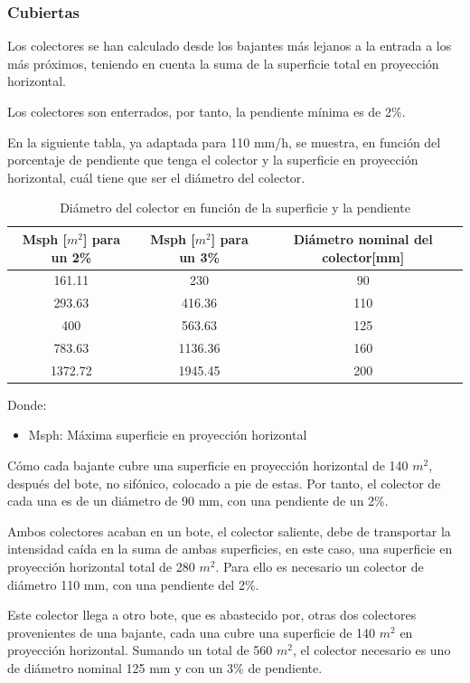 \documentclass[../main.tex]{subfiles}
\begin{document}
\subsubsection{Cubiertas}

Los colectores se han calculado desde los bajantes más lejanos a la entrada a los más próximos, teniendo en cuenta la suma de la superficie total en proyección horizontal.

Los colectores son enterrados, por tanto, la pendiente mínima es de 2\%.

En la siguiente tabla, ya adaptada para 110 mm/h, se muestra, en función del porcentaje de pendiente que tenga el colector y la superficie en proyección horizontal, cuál tiene que ser el diámetro del colector.

\begin{table}[H]
    \centering
    \begin{tabular}{c|c|c}
    Msph [$m^2$] para un 2\% & Msph [$m^2$] para un 3\%  & Diámetro nominal del colector[mm] \\ \hline
    161.11 & 230 & 90 \\
    293.63 & 416.36 & 110 \\
    400 & 563.63 & 125 \\
    783.63 & 1136.36 & 160 \\
    1372.72 & 1945.45 & 200 \\
    
    \end{tabular}
    \caption{Diámetro del colector en función de la superficie y la pendiente}
\end{table}

Donde:

\begin{itemize}
   \item  Msph: Máxima superficie en proyección horizontal 
\end{itemize}

Cómo cada bajante cubre una superficie en proyección horizontal de 140 $m^2$, después del bote, no sifónico, colocado a pie de estas. Por tanto, el colector de cada una es de un diámetro de 90 mm, con una pendiente de un 2\%. 

Ambos colectores acaban en un bote, el colector saliente, debe de transportar la intensidad caída en la suma de ambas superficies, en este caso, una superficie en proyección horizontal total de 280 $m^2$. Para ello es necesario un colector de diámetro 110 mm, con una pendiente del 2\%.

Este colector llega a otro bote, que es abastecido por, otras dos colectores provenientes de una bajante, cada una cubre una superficie de 140 $m^2$ en proyección horizontal. Sumando un total de 560 $m^2$, el colector necesario es uno de diámetro nominal 125 mm y con un 3\% de pendiente.
\end{document}
